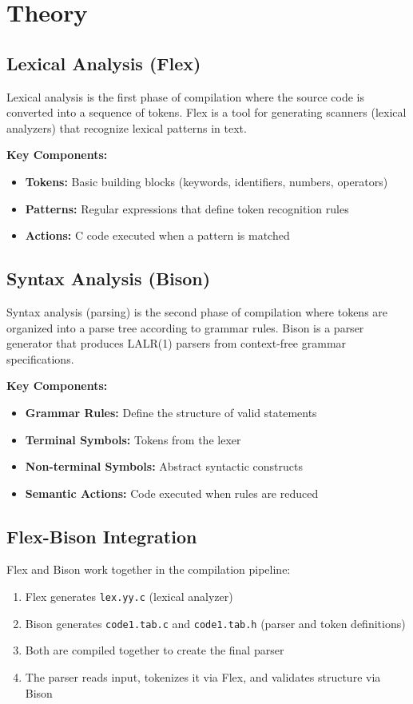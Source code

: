 \documentclass[12pt,a4paper]{article}
\begin{document}
\section{Theory}

\subsection{Lexical Analysis (Flex)}
Lexical analysis is the first phase of compilation where the source code is converted into a sequence of tokens. Flex is a tool for generating scanners (lexical analyzers) that recognize lexical patterns in text.

\textbf{Key Components:}
\begin{itemize}
    \item \textbf{Tokens:} Basic building blocks (keywords, identifiers, numbers, operators)
    \item \textbf{Patterns:} Regular expressions that define token recognition rules
    \item \textbf{Actions:} C code executed when a pattern is matched
\end{itemize}

\subsection{Syntax Analysis (Bison)}
Syntax analysis (parsing) is the second phase of compilation where tokens are organized into a parse tree according to grammar rules. Bison is a parser generator that produces LALR(1) parsers from context-free grammar specifications.

\textbf{Key Components:}
\begin{itemize}
    \item \textbf{Grammar Rules:} Define the structure of valid statements
    \item \textbf{Terminal Symbols:} Tokens from the lexer
    \item \textbf{Non-terminal Symbols:} Abstract syntactic constructs
    \item \textbf{Semantic Actions:} Code executed when rules are reduced
\end{itemize}

\subsection{Flex-Bison Integration}
Flex and Bison work together in the compilation pipeline:
\begin{enumerate}
    \item Flex generates \texttt{lex.yy.c} (lexical analyzer)
    \item Bison generates \texttt{code1.tab.c} and \texttt{code1.tab.h} (parser and token definitions)
    \item Both are compiled together to create the final parser
    \item The parser reads input, tokenizes it via Flex, and validates structure via Bison
\end{enumerate}
\end{document}
